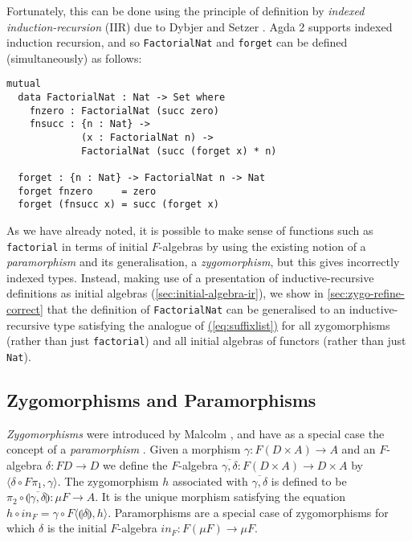 \documentclass{LMCS}
\newcommand{\inn}{\mathit{in}}
\newcommand{\fold}[1]{\llparenthesis #1 \rrparenthesis}
\newcommand{\parenref}[1]{\hyperref[#1]{(\ref*{#1})}}
\begin{document}
Fortunately, this can be done using the principle of definition by
\emph{indexed induction-recursion} (IIR) due to Dybjer and Setzer
\cite{dybjer03induction,dybjer06indexed}. Agda 2 supports indexed
induction recursion, and so \texttt{FactorialNat} and \texttt{forget}
can be defined (simultaneously) as follows:
\begin{verbatim}
mutual
  data FactorialNat : Nat -> Set where
    fnzero : FactorialNat (succ zero)
    fnsucc : {n : Nat} ->
             (x : FactorialNat n) ->
             FactorialNat (succ (forget x) * n)

  forget : {n : Nat} -> FactorialNat n -> Nat
  forget fnzero     = zero
  forget (fnsucc x) = succ (forget x)
\end{verbatim}
\noindent
As we have already noted, it is possible to make sense of functions
such as \texttt{factorial} in terms of initial $F$-algebras by using the
existing notion of a \emph{paramorphism} and its generalisation, a
\emph{zygomorphism}, but this gives incorrectly indexed types.
Instead, making use of a presentation of inductive-recursive
definitions as initial algebras (\autoref{sec:initial-algebra-ir}), we
show in \autoref{sec:zygo-refine-correct} that the definition of
\texttt{FactorialNat} can be generalised to an inductive-recursive
type satisfying the analogue of \parenref{eq:suffixlist} for all
zygomorphisms (rather than just \verb|factorial|) and all initial
algebras of functors (rather than just \verb|Nat|).

\subsection{Zygomorphisms and Paramorphisms}\label{sec:para-zygo}

\emph{Zygomorphisms} were introduced by Malcolm \cite{malcolm90}, and
have as a special case the concept of a \emph{paramorphism}
\cite{meertens92paramorphism}. Given a morphism $\gamma : F(D \times
A) \to A$ and an $F$-algebra $\delta : FD \to D$ we define the
$F$-algebra $\overline{\gamma,\delta} : F(D \times A) \to D \times A$
by $\langle \delta \circ F\pi_1, \gamma\rangle$.
The zygomorphism $h$ associated with $\overline{\gamma,\delta}$ is
defined to be $\pi_2 \circ \fold{\overline{\gamma,\delta}} : \mu F \to
A$. It is the unique morphism satisfying the equation $h \circ \inn_F
= \gamma \circ F\langle\fold{\delta},h\rangle$. Paramorphisms are a
special case of zygomorphisms for which $\delta$ is the initial
$F$-algebra $\inn_F : F(\mu F) \to \mu F$.
\end{document}
